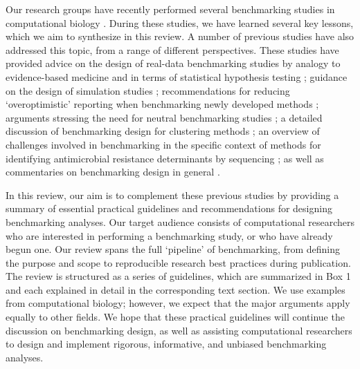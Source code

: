 \documentclass[12pt, a4paper]{article}
\begin{document}
Our research groups have recently performed several benchmarking studies in computational biology \citep{Duo2018, Saelens2018a, Saelens2018b, Soneson2018, Weber2016}. During these studies, we have learned several key lessons, which we aim to synthesize in this review. A number of previous studies have also addressed this topic, from a range of different perspectives. These studies have provided advice on the design of real-data benchmarking studies by analogy to evidence-based medicine \citep{Boulesteix2017} and in terms of statistical hypothesis testing \citep{Boulesteix2015b}; guidance on the design of simulation studies \citep{Morris2018}; recommendations for reducing `overoptimistic' reporting when benchmarking newly developed methods \citep{Boulesteix2015a}; arguments stressing the need for neutral benchmarking studies \citep{Boulesteix2013}; a detailed discussion of benchmarking design for clustering methods \citep{VanMechelen2018}; an overview of challenges involved in benchmarking in the specific context of methods for identifying antimicrobial resistance determinants by sequencing \citep{Angers-Loustau2018}; as well as commentaries on benchmarking design in general \citep{Zheng2017}.

In this review, our aim is to complement these previous studies by providing a summary of essential practical guidelines and recommendations for designing benchmarking analyses. Our target audience consists of computational researchers who are interested in performing a benchmarking study, or who have already begun one. Our review spans the full `pipeline' of benchmarking, from defining the purpose and scope to reproducible research best practices during publication. The review is structured as a series of guidelines, which are summarized in Box 1 and each explained in detail in the corresponding text section. We use examples from computational biology; however, we expect that the major arguments apply equally to other fields. We hope that these practical guidelines will continue the discussion on benchmarking design, as well as assisting computational researchers to design and implement rigorous, informative, and unbiased benchmarking analyses.





\vskip 1cm
\end{document}
